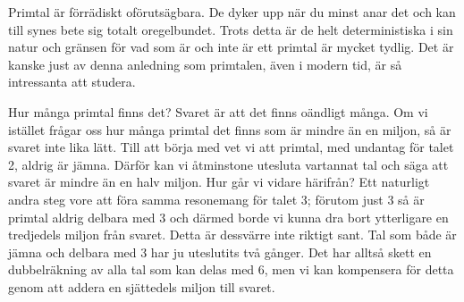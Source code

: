 
Primtal är förrädiskt oförutsägbara.
De dyker upp när du minst anar det och kan till synes bete sig totalt oregelbundet.
Trots detta är de helt deterministiska i sin natur och gränsen för vad som är och inte är ett primtal är mycket tydlig.
Det är kanske just av denna anledning som primtalen, även i modern tid, är så intressanta att studera.


Hur många primtal finns det? Svaret är att det finns oändligt många.
Om vi istället frågar oss hur många primtal det finns som är mindre än en miljon, så är svaret inte lika lätt.
Till att börja med vet vi att primtal, med undantag för talet 2, aldrig är jämna.
Därför kan vi åtminstone utesluta vartannat tal och säga att svaret är mindre än en halv miljon.
Hur går vi vidare härifrån?
Ett naturligt andra steg vore att föra samma resonemang för talet 3;
förutom just 3 så är primtal aldrig delbara med 3 och därmed borde vi kunna dra bort ytterligare en tredjedels miljon från svaret.
Detta är dessvärre inte riktigt sant.
Tal som både är jämna och delbara med 3 har ju uteslutits två gånger.
Det har alltså skett en dubbelräkning av alla tal som kan delas med 6,
men vi kan kompensera för detta genom att addera en sjättedels miljon till svaret.


